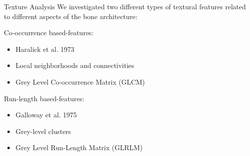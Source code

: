 \documentclass[10pt,aspectratio=169]{beamer}
\begin{document}
\begin{frame}[fragile]{Texture Analysis}
  We investigated two different types of textural features related to different aspects of the bone architecture:
  \vspace{0.1cm}
  \begin{exampleblock}{Co-occurrence based-features:}
    \begin{itemize} \itemsep0.8em
      \item Haralick et al. 1973 \cite{Haralick1973}
      \item Local neighborhoods and connectivities
      \item Grey Level Co-occurrence Matrix (GLCM)
    \end{itemize}
  \end{exampleblock}
  \begin{exampleblock}{Run-length based-features:}
    \begin{itemize} \itemsep0.8em
      \item Galloway et al. 1975 \cite{Galloway1975}
      \item Grey-level clusters
      \item Grey Level Run-Length Matrix (GLRLM)
    \end{itemize}
  \end{exampleblock}
\end{frame}
\end{document}
